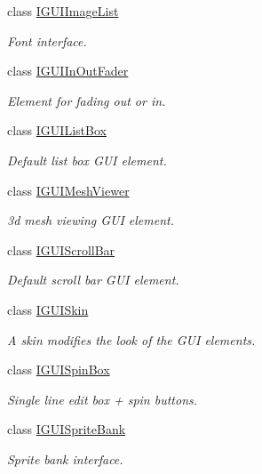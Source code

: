 \begin{DoxyCompactItemize}
class \hyperlink{classirr_1_1gui_1_1IGUIImageList}{I\+G\+U\+I\+Image\+List}
\begin{DoxyCompactList}\small\item\em Font interface. \end{DoxyCompactList}\item 
class \hyperlink{classirr_1_1gui_1_1IGUIInOutFader}{I\+G\+U\+I\+In\+Out\+Fader}
\begin{DoxyCompactList}\small\item\em Element for fading out or in. \end{DoxyCompactList}\item 
class \hyperlink{classirr_1_1gui_1_1IGUIListBox}{I\+G\+U\+I\+List\+Box}
\begin{DoxyCompactList}\small\item\em Default list box G\+UI element. \end{DoxyCompactList}\item 
class \hyperlink{classirr_1_1gui_1_1IGUIMeshViewer}{I\+G\+U\+I\+Mesh\+Viewer}
\begin{DoxyCompactList}\small\item\em 3d mesh viewing G\+UI element. \end{DoxyCompactList}\item 
class \hyperlink{classirr_1_1gui_1_1IGUIScrollBar}{I\+G\+U\+I\+Scroll\+Bar}
\begin{DoxyCompactList}\small\item\em Default scroll bar G\+UI element. \end{DoxyCompactList}\item 
class \hyperlink{classirr_1_1gui_1_1IGUISkin}{I\+G\+U\+I\+Skin}
\begin{DoxyCompactList}\small\item\em A skin modifies the look of the G\+UI elements. \end{DoxyCompactList}\item 
class \hyperlink{classirr_1_1gui_1_1IGUISpinBox}{I\+G\+U\+I\+Spin\+Box}
\begin{DoxyCompactList}\small\item\em Single line edit box + spin buttons. \end{DoxyCompactList}\item 
class \hyperlink{classirr_1_1gui_1_1IGUISpriteBank}{I\+G\+U\+I\+Sprite\+Bank}
\begin{DoxyCompactList}\small\item\em Sprite bank interface. \end{DoxyCompactList}\item 

\end{DoxyCompactItemize}
